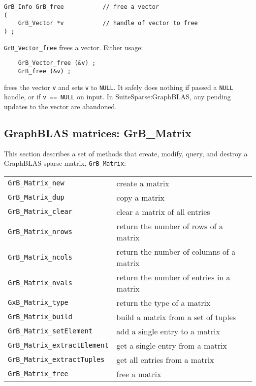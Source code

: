 \documentclass[12pt]{article}
\begin{document}
\begin{mdframed}[userdefinedwidth=6in]
{\footnotesize
\begin{verbatim}
GrB_Info GrB_free           // free a vector
(
    GrB_Vector *v           // handle of vector to free
) ;
\end{verbatim}
} \end{mdframed}

\verb'GrB_Vector_free' frees a vector.  Either usage:

    {\small
    \begin{verbatim}
    GrB_Vector_free (&v) ;
    GrB_free (&v) ; \end{verbatim}}

\noindent
frees the vector \verb'v' and sets \verb'v' to \verb'NULL'.  It safely does
nothing if passed a \verb'NULL' handle, or if \verb'v == NULL' on input.
In SuiteSparse:GraphBLAS, any pending updates to the vector are abandoned.

\newpage
\subsection{GraphBLAS matrices: {\sf GrB\_Matrix}} %
\label{matrix}

This section describes a set of methods that create, modify, query,
and destroy a GraphBLAS sparse matrix, \verb'GrB_Matrix':

\vspace{0.2in}
{\footnotesize
\begin{tabular}{ll}
\hline
\verb'GrB_Matrix_new'           & create a matrix \\
\verb'GrB_Matrix_dup'           & copy a matrix \\
\verb'GrB_Matrix_clear'         & clear a matrix of all entries \\
\verb'GrB_Matrix_nrows'         & return the number of rows of a matrix \\
\verb'GrB_Matrix_ncols'         & return the number of columns of a matrix \\
\verb'GrB_Matrix_nvals'         & return the number of entries in a matrix \\
\verb'GxB_Matrix_type'          & return the type of a matrix \\
\verb'GrB_Matrix_build'         & build a matrix from a set of tuples \\
\verb'GrB_Matrix_setElement'    & add a single entry to a matrix \\
\verb'GrB_Matrix_extractElement'& get a single entry from a matrix \\
\verb'GrB_Matrix_extractTuples' & get all entries from a matrix \\
\verb'GrB_Matrix_free'          & free a matrix \\
\hline
\end{tabular}
}
\vspace{0.2in}
\end{document}
